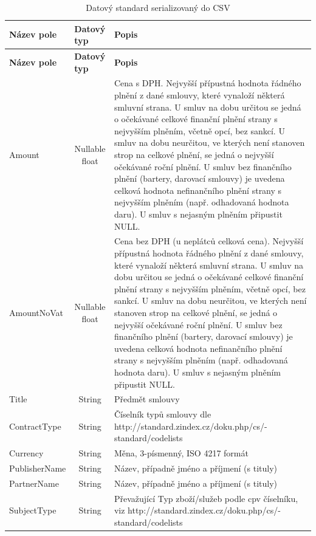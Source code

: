 \begin{center}
\begin{longtable}{lcp{65mm}}
\label{tbl:schema_csv} \\
\multicolumn{1}{l}{\textbf{Název pole}} & 
\multicolumn{1}{l}{\textbf{Datový typ}} & 
\multicolumn{1}{l}{\textbf{Popis}} \\ \hline 
\endfirsthead
\multicolumn{1}{l}{\textbf{Název pole}} & 
\multicolumn{1}{l}{\textbf{Datový typ}} & 
\multicolumn{1}{l}{\textbf{Popis}} \\ \hline 
\hline
\endhead
\endfoot
\caption{Datový standard serializovaný do CSV}
\endlastfoot
\rowcolor{validateC}Amount & Nullable float & Cena s DPH. Nejvyšší přípustná hodnota řádného plnění z dané smlouvy, které vynaloží některá smluvní strana. U smluv na dobu určitou se jedná o očekávané celkové finanční plnění strany s nejvyšším plněním, včetně opcí, bez sankcí. U smluv na dobu neurčitou, ve kterých není stanoven strop na celkové plnění, se jedná o nejvyšší očekávané roční plnění. U smluv bez finančního plnění (bartery, darovací smlouvy) je uvedena celková hodnota nefinančního plnění strany s nejvyšším plněním (např. odhadovaná hodnota daru). U smluv s nejasným plněním připustit NULL. \\
\rowcolor{validateC}AmountNoVat & Nullable float & Cena bez DPH (u neplátců celková cena). Nejvyšší přípustná hodnota řádného plnění z dané smlouvy, které vynaloží některá smluvní strana. U smluv na dobu určitou se jedná o očekávané celkové finanční plnění strany s nejvyšším plněním, včetně opcí, bez sankcí. U smluv na dobu neurčitou, ve kterých není stanoven strop na celkové plnění, se jedná o nejvyšší očekávané roční plnění. U smluv bez finančního plnění (bartery, darovací smlouvy) je uvedena celková hodnota nefinančního plnění strany s nejvyšším plněním (např. odhadovaná hodnota daru). U smluv s nejasným plněním připustit NULL. \\
\rowcolor{validateC}Title & String & Předmět smlouvy \\
ContractType & String & Číselník typů smlouvy dle http://standard.zindex.cz/doku.php/cs/- standard/codelists \\
Currency & String & Měna, 3-písmenný, ISO 4217 formát \\
\rowcolor{validateC}PublisherName & String & Název, případně jméno a příjmení (s tituly) \\
\rowcolor{validateC}PartnerName &String & Název, případně jméno a příjmení (s tituly) \\
SubjectType & String & Převažující Typ zboží/služeb podle cpv číselníku, viz http://standard.zindex.cz/doku.php/cs/- standard/codelists \\

\end{longtable}
\end{center}
